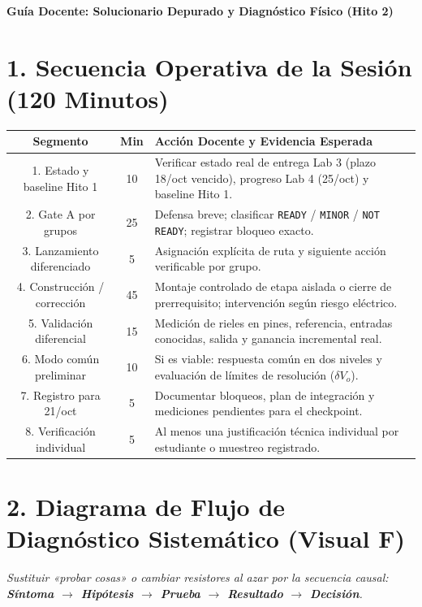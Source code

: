 \documentclass[10pt, a4paper]{article}
\begin{document}
\begin{center}
    \Large\textbf{\textcolor{ucbblue}{Guía Docente: Solucionario Depurado y Diagnóstico Físico (Hito 2)}}
\end{center}

\section*{1. Secuencia Operativa de la Sesión (120 Minutos)}
\begin{table}[htbp]
    \centering
    \footnotesize
    \renewcommand{\arraystretch}{1.25}
    \begin{tabularx}{\textwidth}{|c|c|>{\raggedright\arraybackslash}X|}
    \hline
    \rowcolor[HTML]{EFEFEF} 
    \textbf{Segmento} & \textbf{Min} & \textbf{Acción Docente y Evidencia Esperada} \\ \hline
    1. Estado y baseline Hito 1 & 10 & Verificar estado real de entrega Lab 3 (plazo 18/oct vencido), progreso Lab 4 (25/oct) y baseline Hito 1. \\ \hline
    2. Gate A por grupos & 25 & Defensa breve; clasificar \texttt{READY} / \texttt{MINOR} / \texttt{NOT READY}; registrar bloqueo exacto. \\ \hline
    3. Lanzamiento diferenciado & 5 & Asignación explícita de ruta y siguiente acción verificable por grupo. \\ \hline
    4. Construcción / corrección & 45 & Montaje controlado de etapa aislada o cierre de prerrequisito; intervención según riesgo eléctrico. \\ \hline
    5. Validación diferencial & 15 & Medición de rieles en pines, referencia, entradas conocidas, salida y ganancia incremental real. \\ \hline
    6. Modo común preliminar & 10 & Si es viable: respuesta común en dos niveles y evaluación de límites de resolución ($\delta V_o$). \\ \hline
    7. Registro para 21/oct & 5 & Documentar bloqueos, plan de integración y mediciones pendientes para el checkpoint. \\ \hline
    8. Verificación individual & 5 & Al menos una justificación técnica individual por estudiante o muestreo registrado. \\ \hline
    \end{tabularx}
\end{table}

\section*{2. Diagrama de Flujo de Diagnóstico Sistemático (Visual F)}
\textit{Sustituir «probar cosas» o cambiar resistores al azar por la secuencia causal: \textbf{Síntoma $\rightarrow$ Hipótesis $\rightarrow$ Prueba $\rightarrow$ Resultado $\rightarrow$ Decisión}.}
\end{document}
